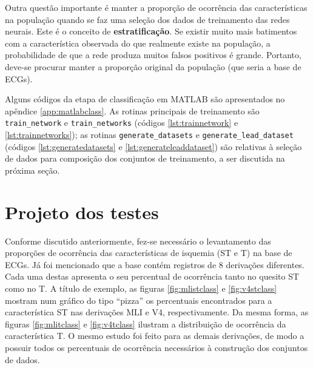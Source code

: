 Outra questão importante é manter a proporção de ocorrência das características na população quando se faz uma seleção dos dados de treinamento das redes neurais. Este é o conceito de \textbf{estratificação}. Se existir muito mais batimentos com a característica observada do que realmente existe na população, a probabilidade de que a rede produza muitos falsos positivos é grande. Portanto, deve-se procurar manter a proporção original da população (que seria a base de ECGs).

Alguns códigos da etapa de classificação em MATLAB são apresentados no apêndice \ref{app:matlabclass}. As rotinas principais de treinamento são \texttt{train\_network} e \texttt{train\_networks} (códigos \ref{lst:trainnetwork} e \ref{lst:trainnetworks}); as rotinas \texttt{generate\_datasets} e \texttt{generate\_lead\_dataset} (códigos \ref{lst:generatedatasets} e \ref{lst:generateleaddataset}) são relativas à seleção de dados para composição dos conjuntos de treinamento, a ser discutida na próxima seção.

\section{Projeto dos testes}
\label{sec:tests}

Conforme discutido anteriormente, fez-se necessário o levantamento das proporções de ocorrência das características de isquemia (ST e T) na base de ECGs. Já foi mencionado que a base contém registros de 8 derivações diferentes. Cada uma destas apresenta o seu percentual de ocorrência tanto no quesito ST como no T. A título de exemplo, as figuras \ref{fig:mlistclass} e \ref{fig:v4stclass} mostram num gráfico do tipo ``pizza'' os percentuais encontrados para a característica ST nas derivações MLI e V4, respectivamente. Da mesma forma, as figuras \ref{fig:mlitclass} e \ref{fig:v4tclass} ilustram a distribuição de ocorrência da característica T. O mesmo estudo foi feito para as demais derivações, de modo a possuir todos os percentuais de ocorrência necessários à construção dos conjuntos de dados.


